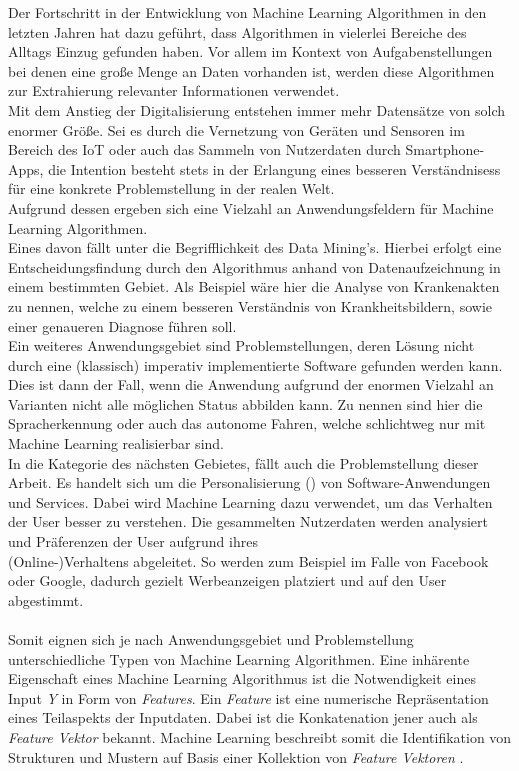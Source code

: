 Der Fortschritt in der Entwicklung von Machine Learning Algorithmen in den letzten Jahren hat dazu geführt, dass Algorithmen in vielerlei Bereiche des Alltags Einzug gefunden haben. Vor allem im Kontext von Aufgabenstellungen bei denen eine große Menge an Daten vorhanden ist, werden diese Algorithmen zur Extrahierung relevanter Informationen verwendet. \\
Mit dem Anstieg der Digitalisierung entstehen immer mehr Datensätze von solch enormer Größe. Sei es durch die Vernetzung von Geräten und Sensoren im Bereich des IoT oder auch das Sammeln von Nutzerdaten durch Smartphone-Apps, die Intention besteht stets in der Erlangung eines besseren Verständnisess für eine konkrete Problemstellung in der realen Welt. \\
Aufgrund dessen ergeben sich eine Vielzahl an Anwendungsfeldern für Machine Learning Algorithmen.\\
Eines davon fällt unter die Begrifflichkeit des Data Mining's. Hierbei erfolgt eine Entscheidungsfindung durch den Algorithmus anhand von Datenaufzeichnung in einem bestimmten Gebiet. Als Beispiel wäre hier die Analyse von Krankenakten zu nennen, welche zu einem besseren Verständnis von Krankheitsbildern, sowie einer genaueren Diagnose führen soll. \\
Ein weiteres Anwendungsgebiet sind Problemstellungen, deren Lösung nicht durch eine (klassisch) imperativ implementierte Software gefunden werden kann.
Dies ist dann der Fall, wenn die Anwendung aufgrund der enormen Vielzahl an Varianten nicht alle möglichen Status abbilden kann. Zu nennen sind hier die Spracherkennung oder auch das autonome Fahren, welche schlichtweg nur mit Machine Learning realisierbar sind.\\
In die Kategorie des nächsten Gebietes, fällt auch die Problemstellung dieser Arbeit. Es handelt sich um die Personalisierung () von Software-Anwendungen und Services. Dabei wird Machine Learning dazu verwendet, um das Verhalten der User besser zu verstehen. Die gesammelten Nutzerdaten werden analysiert und Präferenzen der User aufgrund ihres \\(Online-)Verhaltens abgeleitet. So werden zum Beispiel im Falle von Facebook oder Google, dadurch gezielt Werbeanzeigen platziert und auf den User abgestimmt. \cite{mlmitchel} \\\\
Somit eignen sich je nach Anwendungsgebiet und Problemstellung unterschiedliche Typen von Machine Learning Algorithmen. 
Eine inhärente Eigenschaft eines Machine Learning Algorithmus ist die Notwendigkeit eines Input \textit{Y} in Form von \textit{Features}. Ein \textit{Feature} ist eine numerische Repräsentation eines Teilaspekts der Inputdaten. Dabei ist die Konkatenation jener auch als \textit{Feature Vektor} bekannt. Machine Learning beschreibt somit die Identifikation von Strukturen und Mustern auf Basis einer Kollektion von \textit{Feature Vektoren} \cite{fteng}. \\\\
